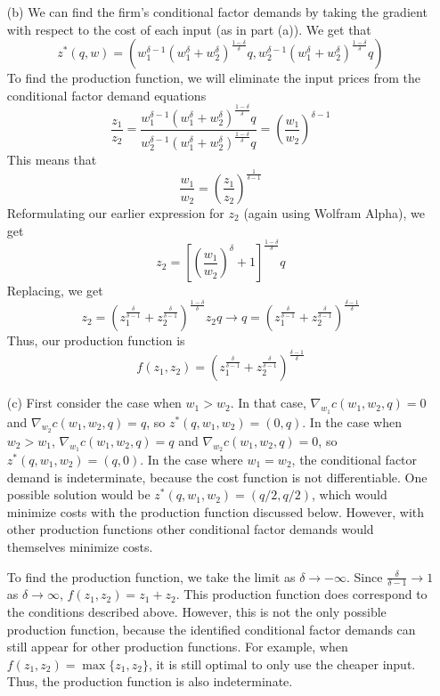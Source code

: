 \documentclass[12pt]{article}
\begin{document}
\begin{itemize}
    \item[(b)] We can find the firm's conditional factor demands by taking the gradient with respect to the cost of each input (as in part (a)). We get that
    \[
    z^*(q,w) = (w_1^{\delta - 1} (w^\delta_1 + w^\delta_2)^{\frac{1-\delta}{\delta}}q,w_2^{\delta - 1} (w^\delta_1 + w^\delta_2)^{\frac{1-\delta}{\delta}}q)
    \]
    To find the production function, we will eliminate the input prices from the conditional factor demand equations
    \[
    \frac{z_1}{z_2} = \frac{w_1^{\delta - 1} (w^\delta_1 + w^\delta_2)^{\frac{1-\delta}{\delta}}q}{w_2^{\delta - 1} (w^\delta_1 + w^\delta_2)^{\frac{1-\delta}{\delta}}q} = \left(\frac{w_1}{w_2}\right)^{\delta - 1}
    \]
    This means that
    \[
    \frac{w_1}{w_2} = \left(\frac{z_1}{z_2} \right)^{\frac{1}{\delta - 1}}
    \]
    Reformulating our earlier expression for $z_2$ (again using Wolfram Alpha), we get
    \[
    z_2 = \left[\left(\frac{w_1}{w_2}\right)^\delta + 1 \right]^{\frac{1-\delta}{\delta}}q
    \]
    Replacing, we get
    \[
    z_2 = \left(z_1^\frac{\delta}{\delta - 1} + z_2^\frac{\delta}{\delta - 1} \right)^\frac{1-\delta}{\delta}z_2 q \rightarrow q = \left(z_1^\frac{\delta}{\delta - 1} + z_2^\frac{\delta}{\delta - 1} \right)^\frac{\delta-1}{\delta}
    \]
    Thus, our production function is
    \[
    f(z_1,z_2) =  \left(z_1^\frac{\delta}{\delta - 1} + z_2^\frac{\delta}{\delta - 1} \right)^\frac{\delta-1}{\delta}
    \]

    \item[(c)] First consider the case when $w_1 > w_2$. In that case, $\nabla_{w_1} c(w_1,w_2,q) = 0$ and $\nabla_{w_2} c(w_1,w_2,q) = q$, so $z^*(q,w_1,w_2) = (0,q)$. In the case when $w_2 > w_1$, $\nabla_{w_1} c(w_1,w_2,q) = q$ and $\nabla_{w_2} c(w_1,w_2,q) = 0$, so $z^*(q,w_1,w_2) = (q,0)$. In the case where $w_1 = w_2$, the conditional factor demand is indeterminate, because the cost function is not differentiable. One possible solution would be $z^*(q,w_1,w_2) = (q/2,q/2)$, which would minimize costs with the production function discussed below. However, with other production functions other conditional factor demands would themselves minimize costs.

    To find the production function, we take the limit as $\delta \to -\infty$. Since $\frac{\delta}{\delta - 1} \to 1$ as $\delta \to \infty$, $f(z_1,z_2) = z_1 + z_2$. This production function does correspond to the conditions described above. However, this is not the only possible production function, because the identified conditional factor demands can still appear for other production functions. For example, when $f(z_1,z_2) = \max\{z_1,z_2\}$, it is still optimal to only use the cheaper input. Thus, the production function is also indeterminate.
\end{itemize}
\end{document}
